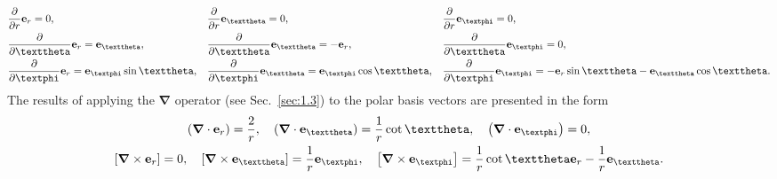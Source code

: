 \begin{equation}
\begin{aligned}
&\frac{\partial}{\partial r} \vect{e}_{r}=0, && \frac{\partial}{\partial r} \vect{e}_{\vartheta}=0, && \frac{\partial}{\partial r} \vect{e}_{\varphi}=0, \\
&\frac{\partial}{\partial \vartheta} \vect{e}_{r}=\vect{e}_{\vartheta}, && \frac{\partial}{\partial \vartheta} \vect{e}_{\vartheta}=-\vect{e}_{r}, && \frac{\partial}{\partial \vartheta} \vect{e}_{\varphi}=0, \\
&\frac{\partial}{\partial \varphi} \vect{e}_{r}=\vect{e}_{\varphi} \sin \vartheta, && \frac{\partial}{\partial \varphi} \vect{e}_{\vartheta}=\vect{e}_{\varphi} \cos \vartheta, && \frac{\partial}{\partial \varphi} \vect{e}_{\varphi}=-\vect{e}_{r} \sin \vartheta-\vect{e}_{\vartheta} \cos \vartheta . \label{eq:1:1:14}
\end{aligned}
\end{equation}
The results of applying the \(\boldsymbol{\nabla}\) operator (see Sec.~\ref{sec:1.3}) to the polar basis vectors are presented in the form
\begin{gather}
\left(\boldsymbol{\nabla} \cdot \vect{e}_{r}\right)=\frac{2}{r}, \quad\left(\boldsymbol{\nabla} \cdot \vect{e}_{\vartheta}\right)=\frac{1}{r} \cot \vartheta, \quad\left(\boldsymbol{\nabla} \cdot \vect{e}_{\varphi}\right)=0,  \label{eq:1:1:15}\\
{\left[\boldsymbol{\nabla} \times \vect{e}_{r}\right]=0, \quad\left[\boldsymbol{\nabla} \times \vect{e}_{\vartheta}\right]=\frac{1}{r} \vect{e}_{\varphi}, \quad\left[\boldsymbol{\nabla} \times \vect{e}_{\varphi}\right]=\frac{1}{r} \cot \vartheta \vect{e}_{r}-\frac{1}{r} \vect{e}_{\vartheta}} .\label{eq:1:1:16}
\end{gather}
